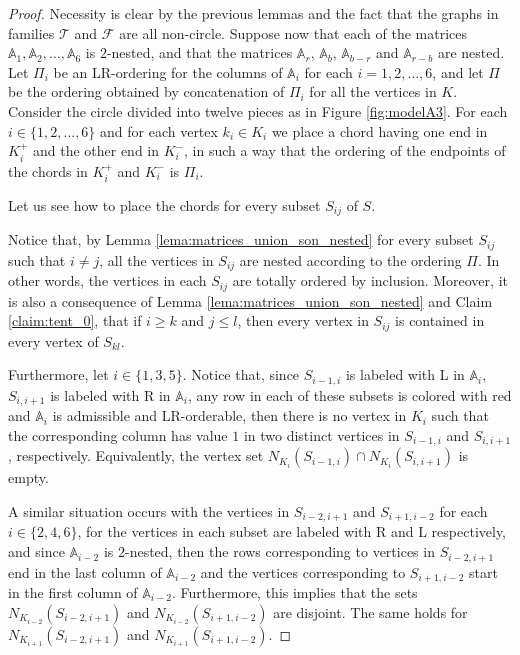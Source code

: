\documentclass[12pt]{book}
\theoremstyle{plain}
\theoremstyle{remark}
\begin{document}
\begin{proof} 
Necessity is clear by the previous lemmas and the fact that the graphs in families $\mathcal{T}$ and $\mathcal{F}$ are all non-circle. Suppose now that each of the matrices $\mathbb A_1,\mathbb A_2,\ldots,\mathbb A_6$ is $2$-nested, and that the matrices $\mathbb A_r$, $\mathbb A_b$, $\mathbb A_{b-r}$ and $\mathbb A_{r-b}$ are nested.
Let $\Pi_i$ be an LR-ordering for the columns of $\mathbb A_i$ for each $i=1,2,\ldots,6$, and let $\Pi$ be the ordering obtained by concatenation of $\Pi_i$ for all the vertices in $K$.
Consider the circle divided into twelve pieces as in Figure \ref{fig:modelA3}. For each $i\in\{1,2,\ldots,6\}$ and for each vertex $k_i \in K_i$ we place a chord having one end in $K_i^+$ and the other end in $K_i^-$, in such a way that the ordering of the endpoints of the chords in $K_i^+$ and $K_i^-$ is $\Pi_i$. 

Let us see how to place the chords for every subset $S_{ij}$ of $S$.

Notice that, by Lemma \ref{lema:matrices_union_son_nested} for every subset $S_{ij}$ such that $i \neq j$, all the vertices in $S_{ij}$ are nested according to the ordering $\Pi$. In other words, the vertices in each $S_{ij}$ are totally ordered by inclusion.
Moreover, it is also a consequence of Lemma \ref{lema:matrices_union_son_nested} and Claim \ref{claim:tent_0}, that if $i \geq k$ and $j\leq l$, then every vertex in $S_{ij}$ is contained in every vertex of $S_{kl}$.

Furthermore, let $i \in \{1, 3, 5\}$. Notice that, since $S_{i-1,i}$ is labeled with L in $\mathbb A_i$, $S_{i,i+1}$ is labeled with R in $\mathbb A_i$, any row in each of these subsets is colored with red and $\mathbb A_i$ is admissible and LR-orderable, then there is no vertex in $K_i$ such that the corresponding column has value $1$ in two distinct vertices in $S_{i-1,i}$ and $S_{i,i+1}$, respectively. Equivalently, the vertex set $N_{K_i}(S_{i-1,i}) \cap N_{K_i}(S_{i,i+1})$ is empty. 

A similar situation occurs with the vertices in $S_{i-2,i+1}$ and $S_{i+1,i-2}$ for each $i\in\{2,4,6\}$, for the vertices in each subset are labeled with R and L respectively, and since $\mathbb A_{i-2}$ is $2$-nested, then the rows corresponding to vertices in $S_{i-2,i+1}$ end in the last column of $\mathbb A_{i-2}$ and the vertices corresponding to $S_{i+1,i-2}$ start in the first column of $\mathbb A_{i-2}$. Furthermore, this implies that the sets $N_{K_{i-2}}(S_{i-2,i+1})$ and $N_{K_{i-2}}(S_{i+1,i-2})$ are disjoint. The same holds for $N_{K_{i+1}}(S_{i-2,i+1})$ and $N_{K_{i+1}}(S_{i+1,i-2})$.



\end{proof}
\end{document}
